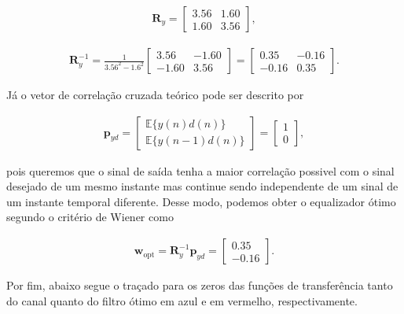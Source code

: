 \documentclass[a4paper,10pt]{article}
\begin{document}
\begin{enumerate}
\begin{enumerate}
						\begin{align}
							\mathbf{R}_{y} =
							\begin{bmatrix}
								3.56 & 1.60 \\
								1.60 & 3.56
							\end{bmatrix},
						\end{align}
						
						\begin{align}
							\mathbf{R}^{-1}_{y} = \frac{1}{3.56^{2} - 1.6^{2}}
							\begin{bmatrix}
								3.56 &  -1.60 \\
								-1.60 & 3.56
							\end{bmatrix} =
							\begin{bmatrix}
								0.35 &  -0.16 \\
								-0.16 & 0.35
							\end{bmatrix}.
						\end{align}
						
						Já o vetor de correlação cruzada teórico pode ser descrito por
						
						\begin{align}
							\mathbf{p}_{yd} =
							\begin{bmatrix}
								\mathbb{E}\{y(n)d(n)\} \\
								\mathbb{E}\{y(n - 1)d(n)\}
							\end{bmatrix} = 
							\begin{bmatrix}
								1 \\
								0
							\end{bmatrix},
						\end{align}
						
						pois queremos que o sinal de saída tenha a maior correlação possivel com o sinal desejado de um mesmo instante mas continue sendo independente de um sinal de um instante temporal diferente.
						Desse modo, podemos obter o equalizador ótimo segundo o critério de Wiener como
						
						\begin{align}
							\mathbf{w}_{\text{opt}} = \mathbf{R}^{-1}_{y} \mathbf{p}_{yd} = \begin{bmatrix}
								0.35 \\
								-0.16
							\end{bmatrix}.
						\end{align}
						
						Por fim, abaixo segue o traçado para os zeros das funções de transferência tanto do canal quanto do filtro ótimo em azul e em vermelho, respectivamente.
						

\end{enumerate}
\end{enumerate}
\end{document}
